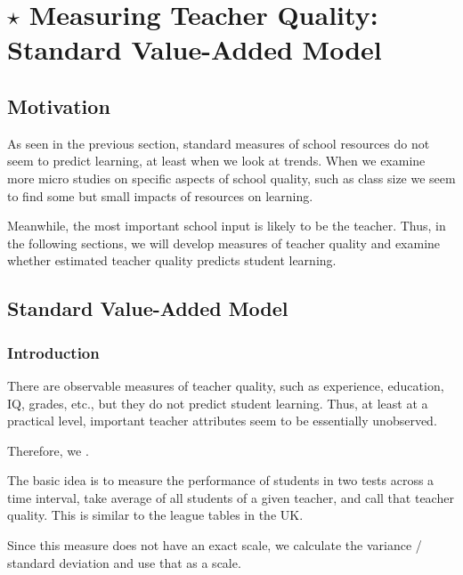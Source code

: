 \section{$\star$ Measuring Teacher Quality: Standard Value-Added Model}
    
    \subsection{Motivation}
        As seen in the previous section, standard measures of school resources do not seem to predict learning, at least when we look at trends. When we examine more micro studies on specific aspects of school quality, such as class size we seem to find some but small impacts of resources on learning.
        
        Meanwhile, the most important school input is likely to be the teacher. Thus, in the following sections, we will develop measures of teacher quality and examine whether estimated teacher quality predicts student learning.
        
    \subsection{Standard Value-Added Model}
        
        \subsubsection{Introduction}
            There are observable measures of teacher quality, such as experience, education, IQ, grades, etc., but they do not predict student learning. Thus, at least at a practical level, important teacher attributes seem to be essentially unobserved.
            
            Therefore, we .
            
            The basic idea is to measure the performance of students in two tests across a time interval, take average of all students of a given teacher, and call that teacher quality. This is similar to the league tables in the UK.

            Since this measure does not have an exact scale, we calculate the variance / standard deviation and use that as a scale.
            
